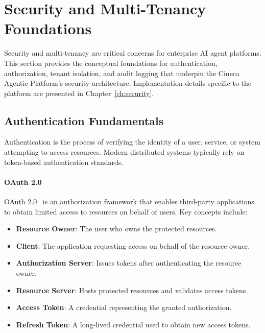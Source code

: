 %
%

\section{Security and Multi-Tenancy Foundations}
\label{sec:security-foundations}

Security and multi-tenancy are critical concerns for enterprise AI agent platforms. This section provides the conceptual foundations for authentication, authorization, tenant isolation, and audit logging that underpin the Cineca Agentic Platform's security architecture. Implementation details specific to the platform are presented in Chapter~\ref{ch:security}.

\subsection{Authentication Fundamentals}

Authentication is the process of verifying the identity of a user, service, or system attempting to access resources. Modern distributed systems typically rely on token-based authentication standards.

\paragraph{OAuth 2.0}

OAuth 2.0~%
is an authorization framework that enables third-party applications to obtain limited access to resources on behalf of users. Key concepts include:

\begin{itemize}
    \item \textbf{Resource Owner}: The user who owns the protected resources.
    \item \textbf{Client}: The application requesting access on behalf of the resource owner.
    \item \textbf{Authorization Server}: Issues tokens after authenticating the resource owner.
    \item \textbf{Resource Server}: Hosts protected resources and validates access tokens.
    \item \textbf{Access Token}: A credential representing the granted authorization.
    \item \textbf{Refresh Token}: A long-lived credential used to obtain new access tokens.
\end{itemize}

